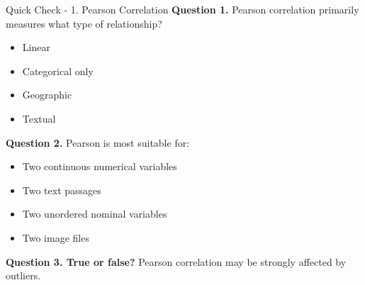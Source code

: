 \documentclass[aspectratio=169,11pt]{beamer}
\begin{document}
\begin{frame}[allowframebreaks]{Quick Check - 1. Pearson Correlation}
\footnotesize
\textbf{Question 1.} Pearson correlation primarily measures what type of relationship?\par\medskip
\begin{itemize}
\item[\textbf{A.}] Linear
\item[\textbf{B.}] Categorical only
\item[\textbf{C.}] Geographic
\item[\textbf{D.}] Textual
\end{itemize}
\textbf{Question 2.} Pearson is most suitable for:\par\medskip
\begin{itemize}
\item[\textbf{A.}] Two continuous numerical variables
\item[\textbf{B.}] Two text passages
\item[\textbf{C.}] Two unordered nominal variables
\item[\textbf{D.}] Two image files
\end{itemize}
\textbf{Question 3. True or false?} Pearson correlation may be strongly affected by outliers.\par\medskip
\end{frame}
\end{document}
